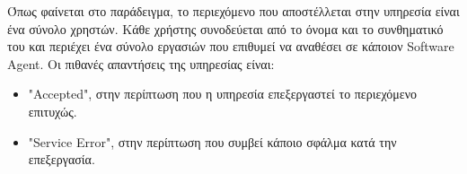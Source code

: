 \documentclass[a4paper,11pt]{article}
\begin{document}
\begin{sloppypar}
Όπως φαίνεται στο παράδειγμα, το περιεχόμενο που αποστέλλεται στην υπηρεσία είναι ένα σύνολο χρηστών. Κάθε χρήστης συνοδεύεται από το όνομα και το συνθηματικό του και περιέχει ένα σύνολο εργασιών που επιθυμεί να αναθέσει σε κάποιον Software Agent. Οι πιθανές απαντήσεις της υπηρεσίας είναι:
\begin{itemize}
\item "Accepted", στην περίπτωση που η υπηρεσία επεξεργαστεί το περιεχόμενο επιτυχώς.
\item "Service Error", στην περίπτωση που συμβεί κάποιο σφάλμα κατά την επεξεργασία.
\end{itemize}

\newpage

\end{sloppypar}
\end{document}
